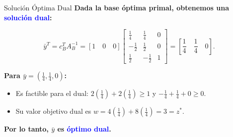 \documentclass{beamer}
\begin{document}
\begin{frame}{Solución Óptima Dual}
    \textbf{Dada la base óptima primal, obtenemos una \textcolor{blue}{solución dual}:}

    \[
    \bar{y}^T = c_B^T A_B^{-1} = \left[ 1 \quad 0 \quad 0 \right] \left[ \begin{array}{ccc}
    \frac{1}{4} & \frac{1}{4} & 0 \\
    -\frac{1}{2} & \frac{1}{2} & 0 \\
    \frac{1}{2} & -\frac{1}{2} & 1
    \end{array} \right] = \left[ \frac{1}{4} \quad \frac{1}{4} \quad 0 \right].
    \]

    \vspace{0.5cm}
    \textbf{Para \(\bar{y} = \left( \frac{1}{4}, \frac{1}{4}, 0 \right)\):}

    \begin{itemize}
        \item Es factible para el dual: \( 2 \left( \frac{1}{4} \right) + 2 \left( \frac{1}{4} \right) \geq 1 \) y \( -\frac{1}{4} + \frac{1}{4} + 0 \geq 0 \).
        \item Su valor objetivo dual es \( w = 4 \left( \frac{1}{4} \right) + 8 \left( \frac{1}{4} \right) = 3 = z^* \).
    \end{itemize}

    \vspace{0.5cm}
    \textbf{Por lo tanto, \(\bar{y}\) es \textcolor{blue}{óptimo dual}.}
\end{frame}
\end{document}
